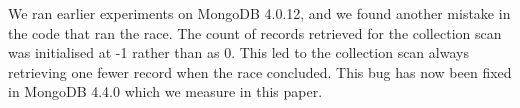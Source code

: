 We ran earlier experiments on MongoDB 4.0.12, and we found another mistake in the code that ran the race. The count of records retrieved for the collection scan was initialised at -1 rather than as 0. This led to the collection scan always retrieving one fewer record when the race concluded. This bug has now been fixed in MongoDB 4.4.0 which we measure in this paper.







